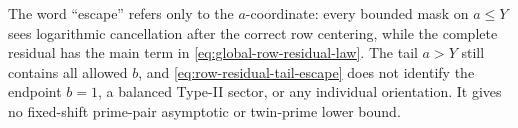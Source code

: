 \begin{remark}
\label{rem:quarter-tail-strict-interpretation}
The word ``escape'' refers only to the $a$-coordinate: every bounded mask
on $a\leq Y$ sees logarithmic cancellation after the correct row
centering, while the complete residual has the main term in
\eqref{eq:global-row-residual-law}.  The tail $a>Y$ still contains all
allowed $b$, and \eqref{eq:row-residual-tail-escape} does not identify the
endpoint $b=1$, a balanced Type-II sector, or any individual orientation.
It gives no fixed-shift prime-pair asymptotic or twin-prime lower bound.
\end{remark}
